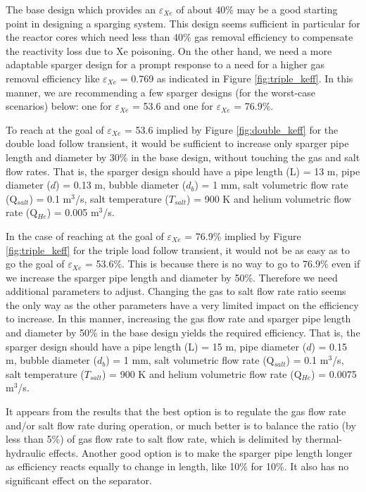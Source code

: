     The base design which provides an $\varepsilon$$_{Xe}$ of about 40\% may be 
    a good starting point in designing a sparging system. This design seems 
    sufficient in particular for the reactor cores which need less than 40\% 
    gas removal efficiency to compensate the reactivity loss due to Xe 
    poisoning. On the other hand, we need a more adaptable sparger design for a 
    prompt response to a need for a higher gas removal efficiency like 
    $\varepsilon$$_{Xe}$ = 0.769 as indicated in Figure \ref{fig:triple_keff}. 
    In this manner, we are recommending a few sparger designs (for the 
    worst-case scenarios) below: one for $\varepsilon$$_{Xe}$ = 53.6 and one 
    for $\varepsilon$$_{Xe}$ = 76.9\%.

    To reach at the goal of $\varepsilon$$_{Xe}$ = 53.6 implied by Figure 
    \ref{fig:double_keff} for the double load follow transient, it would be 
    sufficient to increase only sparger pipe length and diameter by 30\% in the 
    base design, without touching the gas and salt flow rates. That is, the 
    sparger design should have a pipe length (L) = 13 m, pipe diameter ($d$) = 
    0.13 m, bubble diameter ($d_b$) = 1 mm, salt volumetric flow rate 
    (Q$_{salt}$) = 0.1 m$^{3}$/s, salt temperature ($T_{salt}$) = 900 K and 
    helium volumetric flow rate (Q$_{He}$) = 0.005 m$^{3}$/s.

    In the case of reaching at the goal of $\varepsilon$$_{Xe}$ = 76.9\% 
    implied by Figure \ref{fig:triple_keff} for the triple load follow 
    transient, it would not be as easy as to go the goal of 
    $\varepsilon$$_{Xe}$ = 53.6\%. This is because there is no way to go to 
    76.9\% even if we increase the sparger pipe length and diameter by 50\%. 
    Therefore we need additional parameters to adjust. Changing the gas to salt 
    flow rate ratio seems the only way as the other parameters have a very 
    limited impact on the efficiency to increase. In this manner, increasing 
    the gas flow rate and sparger pipe length and diameter by 50\% in the base 
    design yields the required efficiency. That is, the sparger design should 
    have a pipe length (L) = 15 m, pipe diameter ($d$) = 0.15 m, bubble 
    diameter ($d_b$) = 1 mm, salt volumetric flow rate (Q$_{salt}$) = 0.1 
    m$^{3}$/s, salt temperature ($T_{salt}$) = 900 K and helium volumetric flow 
    rate (Q$_{He}$) = 0.0075 m$^{3}$/s.

    It appears from the results that the best option is to regulate the gas 
    flow rate and/or salt flow rate during operation, or much better is to 
    balance the ratio (by less than 5\%) of gas flow rate to salt flow rate, 
    which is delimited by thermal-hydraulic effects. Another good option is to 
    make the sparger pipe length longer as efficiency reacts equally to change 
    in length, like 10\% for 10\%. It also has no significant effect on the 
    separator.


